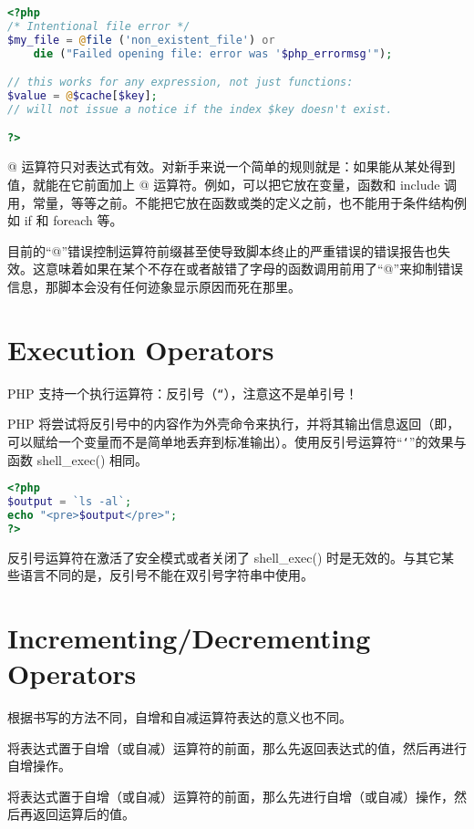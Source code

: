 \begin{lstlisting}[language=PHP]
<?php
/* Intentional file error */
$my_file = @file ('non_existent_file') or
    die ("Failed opening file: error was '$php_errormsg'");

// this works for any expression, not just functions:
$value = @$cache[$key];
// will not issue a notice if the index $key doesn't exist.

?>
\end{lstlisting}

@ 运算符只对表达式有效。对新手来说一个简单的规则就是：如果能从某处得到值，就能在它前面加上 @ 运算符。例如，可以把它放在变量，函数和 include 调用，常量，等等之前。不能把它放在函数或类的定义之前，也不能用于条件结构例如 if 和 foreach 等。

目前的“@”错误控制运算符前缀甚至使导致脚本终止的严重错误的错误报告也失效。这意味着如果在某个不存在或者敲错了字母的函数调用前用了“@”来抑制错误信息，那脚本会没有任何迹象显示原因而死在那里。



\section{Execution Operators}


PHP 支持一个执行运算符：反引号（\texttt{``}），注意这不是单引号！

PHP 将尝试将反引号中的内容作为外壳命令来执行，并将其输出信息返回（即，可以赋给一个变量而不是简单地丢弃到标准输出）。使用反引号运算符“\texttt{`}”的效果与函数 shell\_exec() 相同。

\begin{lstlisting}[language=PHP]
<?php
$output = `ls -al`;
echo "<pre>$output</pre>";
?>
\end{lstlisting}

反引号运算符在激活了安全模式或者关闭了 shell\_exec() 时是无效的。与其它某些语言不同的是，反引号不能在双引号字符串中使用。


\section{Incrementing/Decrementing Operators}

根据书写的方法不同，自增和自减运算符表达的意义也不同。

\begin{compactitem}
\item 将表达式置于自增（或自减）运算符的前面，那么先返回表达式的值，然后再进行自增操作。
\item 将表达式置于自增（或自减）运算符的前面，那么先进行自增（或自减）操作，然后再返回运算后的值。
\end{compactitem}

